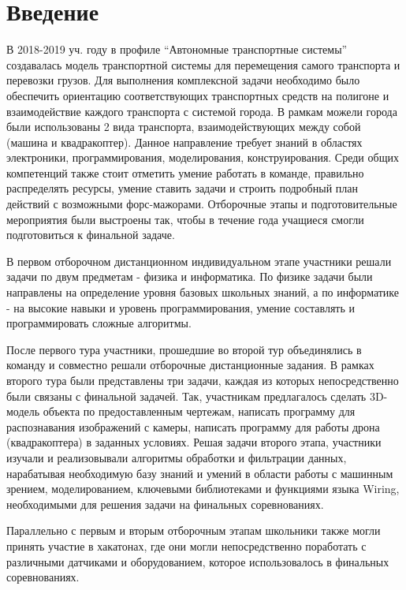 %
\begingroup
\pagestyle{empty}

\section*{Введение}

В 2018-2019 уч. году в профиле “Автономные транспортные системы” создавалась модель транспортной системы для перемещения самого транспорта и перевозки грузов. Для выполнения комплексной задачи необходимо было обеспечить ориентацию соответствующих транспортных средств на полигоне и взаимодействие каждого транспорта с системой города. В рамкам можели города были использованы 2 вида транспорта, взаимодействующих между собой (машина и квадракоптер). Данное направление требует знаний в областях электроники, программирования, моделирования, конструирования. Среди общих компетенций также стоит отметить умение работать в команде, правильно распределять ресурсы, умение ставить задачи и строить подробный план действий с возможными форс-мажорами. Отборочные этапы и подготовительные мероприятия были выстроены так, чтобы в течение года учащиеся смогли подготовиться к финальной задаче. 

В первом отборочном дистанционном индивидуальном этапе участники решали задачи по двум предметам - физика и информатика. По физике задачи были направлены на определение уровня базовых школьных знаний, а по информатике - на высокие навыки и уровень программирования, умение составлять и программировать сложные алгоритмы.

После первого тура участники, прошедшие во второй тур объединялись в команду и совместно решали отборочные дистанционные задания. В рамках второго тура были представлены три задачи, каждая из которых непосредственно были связаны с финальной задачей. Так, участникам предлагалось сделать 3D-модель объекта по предоставленным чертежам, написать программу для распознавания изображений с камеры, написать программу для работы дрона (квадракоптера) в заданных условиях. Решая задачи второго этапа, участники изучали и реализовывали алгоритмы обработки и фильтрации данных, нарабатывая необходимую базу знаний и умений в области работы с машинным зрением, моделированием, ключевыми библиотеками и функциями языка Wiring, необходимыми для решения задачи на финальных соревнованиях.

Параллельно с первым и вторым отборочным этапам школьники также могли принять участие в хакатонах, где они могли непосредственно поработать с различными датчиками и оборудованием, которое использовалось в финальных соревнованиях.

